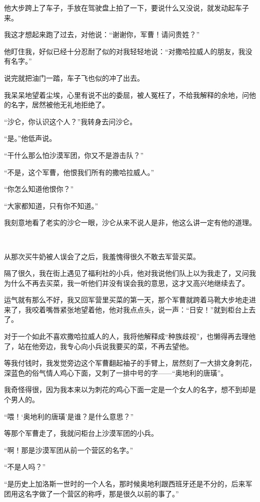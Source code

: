 \par 他大步跨上了车子，手放在驾驶盘上拍了一下，要说什么又没说，就发动起车子来。
\par 我这才想起来跑了过去，对他说：“谢谢你，军曹！请问贵姓？”
\par 他盯住我，好似已经十分忍耐了似的对我轻轻地说：“对撒哈拉威人的朋友，我没有名字。”
\par 说完就把油门一踏，车子飞也似的冲了出去。
\par 我呆呆地望着尘埃，心里有说不出的委屈，被人冤枉了，不给我解释的余地，问他的名字，居然被他无礼地拒绝了。
\par “沙仑，你认识这个人？”我转身去问沙仑。
\par “是。”他低声说。
\par “干什么那么怕沙漠军团，你又不是游击队？”
\par “不是，这个军曹，他恨我们所有的撒哈拉威人。”
\par “你怎么知道他恨你？”
\par “大家都知道，只有你不知道。”
\par 我刻意地看了老实的沙仑一眼，沙仑从来不说人是非，他这么讲一定有他的道理。
\par  
\par 从那次买牛奶被人误会了之后，我羞愧得很久不敢去军营买菜。
\par 隔了很久，我在街上遇见了福利社的小兵，他对我说他们队上以为我走了，又问我为什么不再去买菜，我一听他们并没有误会我的意思，这才又高兴地继续去了。
\par 运气就有那么不好，我又回军营里买菜的第一天，那个军曹就跨着马靴大步地走进来了，我咬着嘴唇紧张地望着他，他对我点点头，说一声：“日安！”就到柜台上去了。
\par 对于一个如此不喜欢撒哈拉威人的人，我将他解释成“种族歧视”，也懒得再去理他了，站在他旁边，我专心向小兵说我要买的菜，不再去望他。
\par 等我付钱时，我发觉旁边这个军曹翻起袖子的手臂上，居然刻了一大排文身刺花，深蓝色的俗气情人鸡心下面，又刺了一排中号的字——“奥地利的唐璜”。
\par 我奇怪得很，因为我本来以为刺花的鸡心下面一定是一个女人的名字，想不到却是个男人的。
\par “喂！‘奥地利的唐璜’是谁？是什么意思？”
\par 等那个军曹走了，我就问柜台上沙漠军团的小兵。
\par “啊！那是沙漠军团从前一个营区的名字。”
\par “不是人吗？”
\par “是历史上加洛斯一世时的一个人名，那时候奥地利跟西班牙还是不分的，后来军团用这名字做了一个营区的称呼，那是很久以前的事了。”
